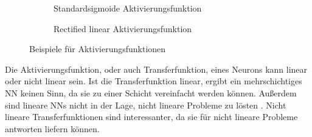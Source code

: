 \begin{figure}
  \centering
  \begin{subfigure}{.5\textwidth}
    \centering
    \caption{Standardsigmoide Aktivierungsfunktion}
    \label{fig:sigmoid}
  \end{subfigure}%
  \begin{subfigure}{.5\textwidth}
    \centering
    \caption{Rectified linear Aktivierungsfunktion}
    \label{fig:Relu}
  \end{subfigure}
  \caption{Beispiele für Aktivierungsfunktionen}
  \label{fig:activationfunction}
\end{figure}

Die Aktivierungsfunktion, oder auch Transferfunktion, eines Neurons kann linear oder nicht linear sein. Ist die Transferfunktion linear, ergibt ein mehrschichtiges \ac{NN} keinen Sinn, da sie zu einer Schicht vereinfacht werden können. Außerdem sind lineare \acp{NN} nicht in der Lage, nicht lineare Probleme zu lösten \cite{minsky1969perceptron}. Nicht lineare Transferfunktionen sind interessanter, da sie für nicht lineare Probleme antworten liefern können.

